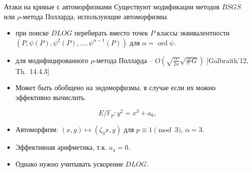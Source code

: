 \documentclass{beamer}
\begin{document}
%

\begin{frame}{Атаки на кривые с автоморфизмами}
Существуют модификации методов $BSGS$ или $\rho$-метода Полларда, использующие автоморфизмы.

\begin{itemize}
    \item {} при поиске $DLOG$ перебирать вместо точек $P$ классы эквивалентности $(P, \psi(P), \psi^2(P), \ldots, \psi^{\alpha-1}(P))$ для $\alpha = \operatorname{ord}{\psi}$.
    \item {} для модифицированного $\rho$-метода Полларда -- $O(\sqrt{\frac{\pi}{2\alpha}}\sqrt{\#G})$ [Galbraith'12, Th.~14.4.3]
\end{itemize}
\end{frame}

\begin{frame}
    \begin{itemize}
    \item Может быть обобщено на эндоморфизмы, в случае если их можно эффективно вычислить.
    \end{itemize}

    \[E/\mathbb{F}_p: y^2 = x^3 + a_6,\]
    \begin{itemize}
        \item Автоморфизм: $(x,y) \mapsto (\zeta_3 x, y)$ для $p \equiv 1 \pmod{3}$, $\alpha = 3$.
        \item Эффективная арифметика, т.к. $a_4 = 0$.
        \item Однако нужно учитывать ускорение $DLOG$.
    \end{itemize}
\end{frame}
\end{document}
